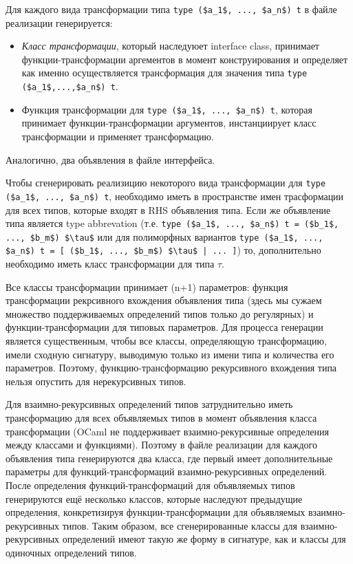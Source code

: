 \documentclass[acmsmall,review,anonymous]{acmart}\settopmatter{printfolios=true,printccs=false,printacmref=false}
\begin{document}
Для каждого вида трансформации типа \lstinline{type ($a_1$, ..., $a_n$) t} в файле реализации генерируется:
\begin{itemize}
 \item \textit{Класс трансформации}, который наследуюет interface class, принимает функции-трансформации аргементов в момент конструирования и 
	определяет как именно осуществляется трансформация для значения типа \lstinline{type ($a_1$,...,$a_n$) t}.
 \item Функция трансформации для \lstinline{type ($a_1$, ..., $a_n$) t}, которая принимает функции-трансформации аргументов, инстанциирует
	класс трансформации и применяет трансформацию.
\end{itemize}
Аналогично, два объявления в файле интерфейса.

Чтобы сгенерировать реализицию некоторого вида трансформации для \lstinline{type ($a_1$, ..., $a_n$) t}, необходимо иметь в пространстве имен
трасформации для всех типов, которые входят в RHS объявления типа. Если же объявление типа является type abbrevation (т.е. 
 \lstinline{type ($a_1$, ..., $a_n$) t = ($b_1$, ..., $b_m$) $\tau$} или для полиморфных вариантов 
 \lstinline{type ($a_1$, ..., $a_n$) t = [ ($b_1$, ..., $b_m$) $\tau$ | ... ]}) 
 то, дополнительно необходимо иметь класс трансформации для типа
 $\tau$.

Все классы трансформации принимает (n+1) параметров: функция трансформации рекрсивного вхождения объявления типа 
(здесь мы сужаем множество поддерживаемых определений типов только до регулярных) и функции-трансформации для типовых параметров. Для процесса
генерации является существенным, чтобы все классы, определяющую трансформацию, имели сходную сигнатуру, выводимую только из имени типа 
и количества его параметров. Поэтому, функцию-трансформацию рекурсивного вхождения типа нельзя опустить для нерекурсивных типов.

Для взаимно-рекурсивных определений типов затруднительно иметь трансформацию для всех объявляемых типов в момент объявления класса 
трансформации (OCaml не поддерживает взаимно-рекурсивные определения между классами и функциями). Поэтому в файле реализации 
для каждого объявления типа генерируются два класса, где первый имеет дополнительные параметры для функций-трансформаций
взаимно-рекурсивных определений. После определения функций-трансформаций для объявляемых типов генерируются ещё несколько классов,
которые наследуют предыдущие определения, конкретизируя функции-трансформации для объявляемых взаимно-рекурсивных типов. 
Таким образом, все сгенерированные классы для взаимно-рекурсивных определений имеют такую же форму в сигнатуре, как и классы для
одиночных определений типов.
\end{document}

